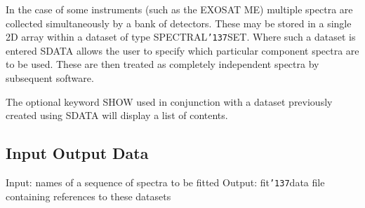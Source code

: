 \documentclass{book}
\renewcommand{\_}{{\tt\char'137}}     %
\begin{document}
In the case of some instruments (such as the EXOSAT ME) multiple
spectra are collected simultaneously by a bank of detectors.
These may be stored in a single 2D array within a dataset of type
SPECTRAL\_SET. Where such a dataset is entered SDATA allows the
user to specify which particular component spectra are to be
used. These are then treated as completely independent spectra by
subsequent software.

The optional keyword SHOW used in conjunction with a dataset
previously created using SDATA will display a list of contents.

\subsection{Input Output Data}
Input: names of a sequence of spectra to be fitted
Output: fit\_data file containing references to these datasets
\end{document}
